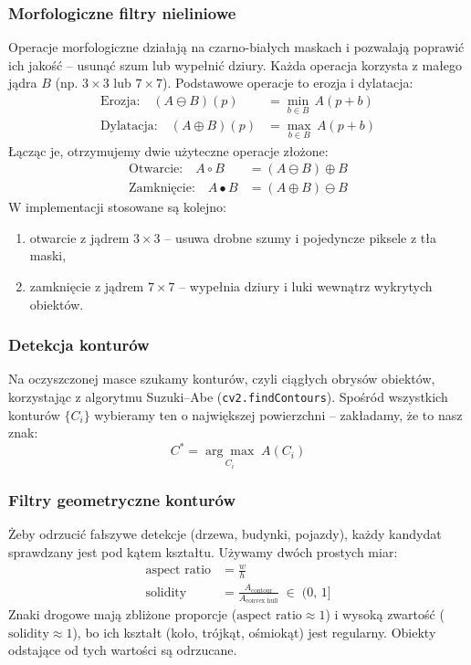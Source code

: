 \documentclass[12pt,oneside]{article}
\begin{document}
\subsubsection{Morfologiczne filtry nieliniowe}
Operacje morfologiczne działają na czarno-białych maskach i pozwalają poprawić ich jakość
-- usunąć szum lub wypełnić dziury. Każda operacja korzysta z małego jądra $B$ (np.
$3\times3$ lub $7\times7$). Podstawowe operacje to erozja i dylatacja:
\begin{align}
    \text{Erozja:}\quad   (A \ominus B)(p) &= \min_{b \in B}\, A(p + b)
    \label{eq:erosion}\\
    \text{Dylatacja:}\quad (A \oplus B)(p)  &= \max_{b \in B}\, A(p + b)
    \label{eq:dilation}
\end{align}
Łącząc je, otrzymujemy dwie użyteczne operacje złożone:
\begin{align}
    \text{Otwarcie:}\quad  A \circ B   &= (A \ominus B) \oplus B
    \label{eq:opening}\\
    \text{Zamknięcie:}\quad A \bullet B &= (A \oplus B) \ominus B
    \label{eq:closing}
\end{align}
W implementacji stosowane są kolejno:
\begin{enumerate}
    \item otwarcie z jądrem $3 \times 3$ -- usuwa drobne szumy i pojedyncze piksele
          z tła maski,
    \item zamknięcie z jądrem $7 \times 7$ -- wypełnia dziury i luki wewnątrz
          wykrytych obiektów.
\end{enumerate}

\subsubsection{Detekcja konturów}
Na oczyszczonej masce szukamy konturów, czyli ciągłych obrysów obiektów, korzystając
z algorytmu Suzuki--Abe (\texttt{cv2.findContours}). Spośród wszystkich konturów
$\{C_i\}$ wybieramy ten o największej powierzchni -- zakładamy, że to nasz znak:
\begin{equation}
    C^* = \underset{C_i}{\arg\max}\; A(C_i)
    \label{eq:maxcontour}
\end{equation}

\subsubsection{Filtry geometryczne konturów}
Żeby odrzucić fałszywe detekcje (drzewa, budynki, pojazdy), każdy kandydat sprawdzany
jest pod kątem kształtu. Używamy dwóch prostych miar:
\begin{align}
    \text{aspect ratio} &= \frac{w}{h}
    \label{eq:ar}\\
    \text{solidity} &= \frac{A_{\text{contour}}}{A_{\text{convex hull}}} \;\in\; (0,\,1]
    \label{eq:solidity}
\end{align}
Znaki drogowe mają zbliżone proporcje ($\text{aspect ratio} \approx 1$) i wysoką
zwartość ($\text{solidity} \approx 1$), bo ich kształt (koło, trójkąt, ośmiokąt)
jest regularny. Obiekty odstające od tych wartości są odrzucane.
\end{document}

